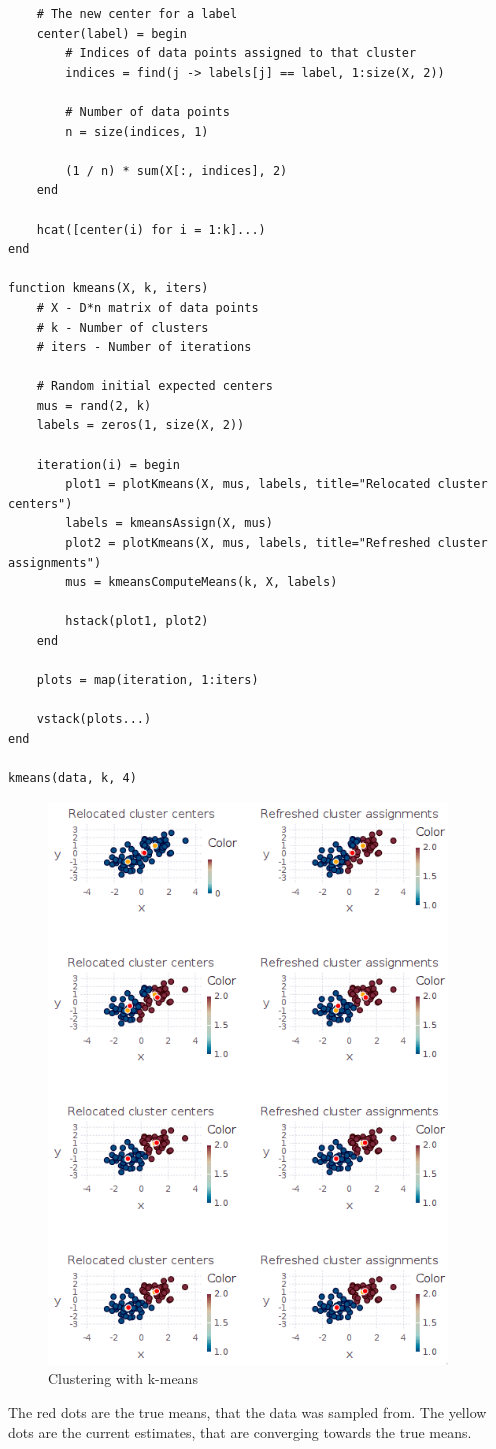 \documentclass[10pt,a4paper]{article}
\begin{document}
\begin{verbatim}
    # The new center for a label
    center(label) = begin
        # Indices of data points assigned to that cluster
        indices = find(j -> labels[j] == label, 1:size(X, 2))

        # Number of data points
        n = size(indices, 1)

        (1 / n) * sum(X[:, indices], 2)
    end

    hcat([center(i) for i = 1:k]...)
end

function kmeans(X, k, iters)
    # X - D*n matrix of data points
    # k - Number of clusters
    # iters - Number of iterations

    # Random initial expected centers
    mus = rand(2, k)
    labels = zeros(1, size(X, 2))

    iteration(i) = begin
        plot1 = plotKmeans(X, mus, labels, title="Relocated cluster centers")
        labels = kmeansAssign(X, mus)
        plot2 = plotKmeans(X, mus, labels, title="Refreshed cluster assignments")
        mus = kmeansComputeMeans(k, X, labels)

        hstack(plot1, plot2)
    end

    plots = map(iteration, 1:iters)

    vstack(plots...)
end

kmeans(data, k, 4)
\end{verbatim}
\begin{figure}[ht]
  \centering
  \includegraphics[width=300pt]{8_2}
  \caption{Clustering with k-means}
\end{figure}
The red dots are the true means, that the data was sampled from. The yellow dots
are the current estimates, that are converging towards the true means.
\end{document}

